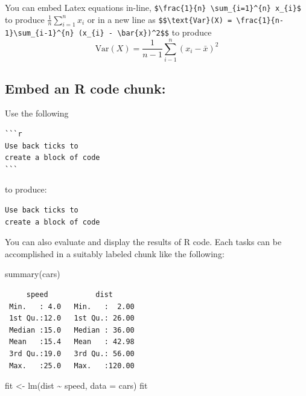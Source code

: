 \documentclass[
]{book}
\newenvironment{Shaded}{\begin{snugshade}}{\end{snugshade}}
\newcommand{\AttributeTok}[1]{\textcolor[rgb]{0.77,0.63,0.00}{#1}}
\newcommand{\FunctionTok}[1]{\textcolor[rgb]{0.00,0.00,0.00}{#1}}
\newcommand{\NormalTok}[1]{#1}
\newcommand{\OtherTok}[1]{\textcolor[rgb]{0.56,0.35,0.01}{#1}}
\newcommand{\SpecialCharTok}[1]{\textcolor[rgb]{0.00,0.00,0.00}{#1}}
\begin{document}
You can embed Latex equations in-line, \texttt{\$\textbackslash{}frac\{1\}\{n\}\ \textbackslash{}sum\_\{i=1\}\^{}\{n\}\ x\_\{i\}\$} to produce \(\frac{1}{n} \sum_{i=1}^{n} x_{i}\) or in a new line as \texttt{\$\$\textbackslash{}text\{Var\}(X)\ =\ \textbackslash{}frac\{1\}\{n-1\}\textbackslash{}sum\_\{i-1\}\^{}\{n\}\ (x\_\{i\}\ -\ \textbackslash{}bar\{x\})\^{}2\$\$} to produce \[\text{Var}(X) = \frac{1}{n-1}\sum_{i-1}^{n} (x_{i} - \bar{x})^2\]

\hypertarget{embed-an-r-code-chunk}{%
\subsection{Embed an R code chunk:}\label{embed-an-r-code-chunk}}

Use the following

\begin{verbatim}
```r
Use back ticks to 
create a block of code
```
\end{verbatim}

to produce:

\begin{verbatim}
Use back ticks to 
create a block of code
\end{verbatim}

You can also evaluate and display the results of R code. Each tasks can be accomplished in a suitably labeled chunk like the following:

\begin{Shaded}
\begin{Highlighting}[]
\FunctionTok{summary}\NormalTok{(cars)}
\end{Highlighting}
\end{Shaded}

\begin{verbatim}
     speed           dist       
 Min.   : 4.0   Min.   :  2.00  
 1st Qu.:12.0   1st Qu.: 26.00  
 Median :15.0   Median : 36.00  
 Mean   :15.4   Mean   : 42.98  
 3rd Qu.:19.0   3rd Qu.: 56.00  
 Max.   :25.0   Max.   :120.00  
\end{verbatim}

\begin{Shaded}
\begin{Highlighting}[]
\NormalTok{fit }\OtherTok{\textless{}{-}} \FunctionTok{lm}\NormalTok{(dist }\SpecialCharTok{\textasciitilde{}}\NormalTok{ speed, }\AttributeTok{data =}\NormalTok{ cars)}
\NormalTok{fit}
\end{Highlighting}
\end{Shaded}
\end{document}
